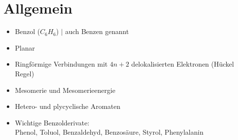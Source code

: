 \section{Allgemein}

\begin{multicols}{2}

\begin{itemize}
    \item Benzol ($C_6H_6$) $|$ auch Benzen genannt
    \item Planar
    \item Ringförmige Verbindungen mit $4n+2$ delokalisierten Elektronen (Hückel Regel)
    \item Mesomerie und Mesomerieenergie
    \item Hetero- und plycyclische Aromaten
    \item Wichtige Benzolderivate: \\
        Phenol, Toluol, Benzaldehyd, Benzosäure, Styrol, Phenylalanin
\end{itemize}

\end{multicols}
